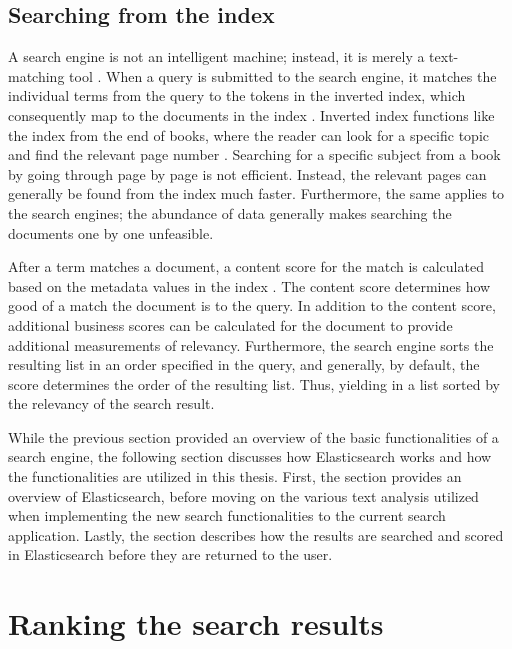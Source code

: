 \subsection{Searching from the index}
\label{ss:searchTime}
A search engine is not an intelligent machine; instead, it is merely a text-matching tool \cite{relevantSearch}. 
When a query is submitted to the search engine, it 
matches the individual terms from the query to the tokens in the inverted index, 
which consequently map to the documents in the index \cite{relevantSearch}. 
Inverted index functions like the index from the end of books, 
where the reader can look for a specific topic and find the relevant page number \cite{relevantSearch}.
Searching for a specific subject from a book by going through page by page is not efficient.
Instead, the relevant pages can generally be found from the index much faster.
Furthermore, the same applies to the search engines;
the abundance of data generally makes searching the documents one by one unfeasible.


After a term matches a document, a content score for the match is calculated based on the metadata values in the index
\cite{relevantSearch}.
The content score determines how good of a match the document is to the query.
In addition to the content score, additional business scores can be calculated for the document to provide 
additional measurements of relevancy.
Furthermore, the search engine sorts the resulting list in an order specified in the query, and generally, 
by default, the score determines the order of the resulting list. 
Thus, yielding in a list sorted by the relevancy of the search result.


While the previous section provided an overview of the basic functionalities of a search engine,
the following section discusses how Elasticsearch works and how the functionalities are utilized in this thesis.
First, the section provides an overview of Elasticsearch, before moving on the various text analysis 
utilized when implementing the new search functionalities to the current search application.
Lastly, the section describes how the results are searched and scored in Elasticsearch before they 
are returned to the user.




\section{Ranking the search results}
\label{sec:ranking}

